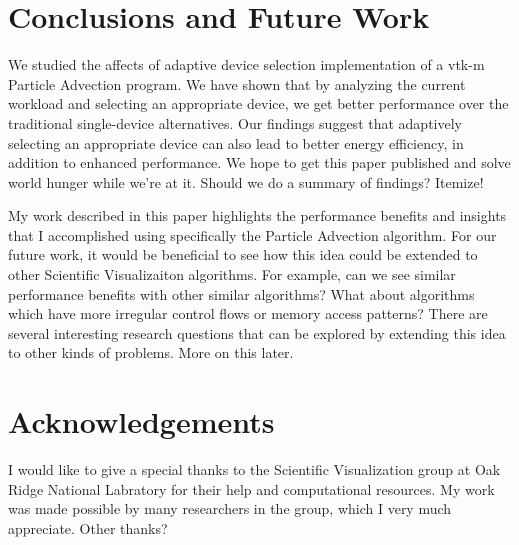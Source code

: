 \documentclass{IEEEtran}
\begin{document}
\section{Conclusions and Future Work}
We studied the affects of adaptive device selection implementation of a vtk-m Particle Advection program. 
%
We have shown that by analyzing the current workload and selecting an appropriate device, we get better performance over the traditional single-device alternatives. 
%
Our findings suggest that adaptively selecting an appropriate device can also lead to better energy efficiency, in addition to enhanced performance. 
%
We hope to get this paper published and solve world hunger while we're at it.
%
Should we do a summary of findings? Itemize!

My work described in this paper highlights the performance benefits and insights that I accomplished using specifically the Particle Advection algorithm.
%
For our future work, it would be beneficial to see how this idea could be extended to other Scientific Visualizaiton algorithms.
%
For example, can we see similar performance benefits with other similar algorithms?
%
What about algorithms which have more irregular control flows or memory access patterns?
%
There are several interesting research questions that can be explored by extending this idea to other kinds of problems.
%
More on this later.
%
\section{Acknowledgements}
I would like to give a special thanks to the Scientific Visualization group at Oak Ridge National Labratory for their help and computational resources.
%
My work was made possible by many researchers in the group, which I very much appreciate.
%
Other thanks?

 

\end{document}

